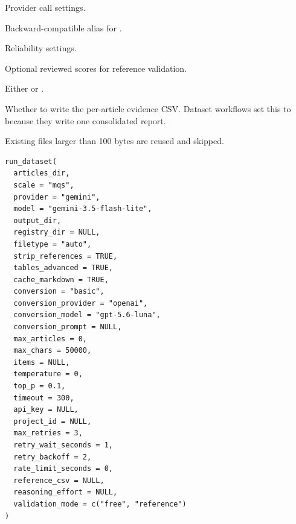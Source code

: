 \documentclass[a4paper]{book}
\begin{document}
\begin{Arguments}
\begin{ldescription}
\item[\code{temperature, top\_p, timeout, api\_key, project\_id}] Provider call settings.

\item[\code{pdf\_path}] Backward-compatible alias for .

\item[\code{max\_retries, retry\_wait\_seconds, retry\_backoff, rate\_limit\_seconds}] Reliability settings.

\item[\code{reference\_scores}] Optional reviewed scores for reference validation.

\item[\code{validation\_mode}] Either  or .

\item[\code{write\_evidence}] Whether to write the per-article evidence CSV. Dataset
workflows set this to  because they write one consolidated report.
\end{ldescription}
\end{Arguments}
%
\begin{Description}
Existing  files larger than 100 bytes are reused and skipped.
\end{Description}
%
\begin{Usage}
\begin{verbatim}
run_dataset(
  articles_dir,
  scale = "mqs",
  provider = "gemini",
  model = "gemini-3.5-flash-lite",
  output_dir,
  registry_dir = NULL,
  filetype = "auto",
  strip_references = TRUE,
  tables_advanced = TRUE,
  cache_markdown = TRUE,
  conversion = "basic",
  conversion_provider = "openai",
  conversion_model = "gpt-5.6-luna",
  conversion_prompt = NULL,
  max_articles = 0,
  max_chars = 50000,
  items = NULL,
  temperature = 0,
  top_p = 0.1,
  timeout = 300,
  api_key = NULL,
  project_id = NULL,
  max_retries = 3,
  retry_wait_seconds = 1,
  retry_backoff = 2,
  rate_limit_seconds = 0,
  reference_csv = NULL,
  reasoning_effort = NULL,
  validation_mode = c("free", "reference")
)
\end{verbatim}
\end{Usage}
%
\end{document}
